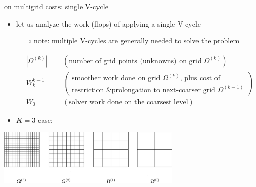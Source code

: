 \documentclass[10pt,
               svgnames,
               hyperref={colorlinks,citecolor=DeepPink4,linkcolor=FireBrick,urlcolor=Maroon},
               usepdftitle=false]{beamer}
\begin{document}
\begin{frame}{on multigrid costs: single V-cycle}
\begin{itemize}
\item let us analyze the work (flops) of applying a single V-cycle
    \begin{itemize}
    \item[$\circ$] note: multiple V-cycles are generally needed to solve the problem
    \end{itemize}

\medskip
\begin{definitions}

\vspace{-4mm}
\begin{align*}
|\Omega^{(k)}| &= (\text{number of grid points (unknowns) on grid $\Omega^{(k)}$}) \\
W_k^{k-1} &= \left(\begin{matrix} \text{smoother work done on grid $\Omega^{(k)}$, plus cost of} \\ \text{restriction \& prolongation to next-coarser grid $\Omega^{(k-1)}$} \end{matrix}\right) \\
W_0 &= (\text{solver work done on the coarsest level})
\end{align*}
\end{definitions}

\medskip
\item $K=3$ case:
\end{itemize}

\vspace{-3mm}
\hfill \includegraphics[width=0.65\textwidth]{images/multigrid-grids.png}
\end{frame}
\end{document}
